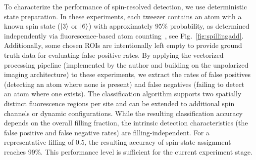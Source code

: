 To characterize the performance of spin-resolved detection, we use deterministic state preparation. In these experiments, each tweezer contains an atom with a known spin state ($\left| 3 \right\rangle$ or $\left| 6 \right\rangle$) with approximately 95\% probability, as determined independently via fluorescence-based atom counting~\cite{dux_optical_2023}, see Fig.~\ref{fig:spillingadd}. Additionally, some chosen ROIs are intentionally left empty to provide ground truth data for evaluating false positive rates. By applying the vectorized processing pipeline (implemented by the author and building on the unpolarized imaging architecture) to these experiments, we extract the rates of false positives (detecting an atom where none is present) and false negatives (failing to detect an atom where one exists). The classification algorithm supports two spatially distinct fluorescence regions per site and can be extended to additional spin channels or dynamic configurations. While the resulting classification accuracy depends on the overall filling fraction, the intrinsic detection characteristics (the false positive and false negative rates) are filling-independent. For a representative filling of 0.5, the resulting accuracy of spin-state assignment reaches 99\%. This performance level is sufficient for the current experiment stage.